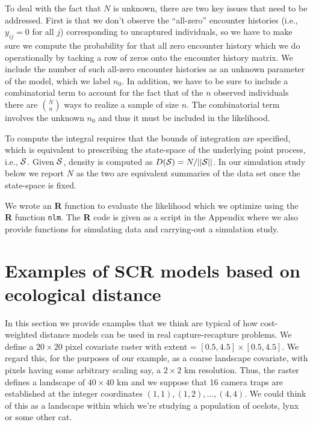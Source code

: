 \documentclass[12pt]{article}
\begin{document}
\begin{spacing}{1.8}
To deal with the fact that $N$ is unknown, there are two key issues
that need to be addressed.  First is that we don't observe the
``all-zero'' encounter histories (i.e., $y_{ij} = 0$ for all $j$)
corresponding to uncaptured individuals, so we have to make sure we
compute the probability for that all zero encounter history which we
do operationally by tacking a row of zeros onto the encounter history
matrix. We include the number of such all-zero encounter histories as
an unknown parameter of the model, which we label $n_{0}$.  In
addition, we have to be sure to include a combinatorial term to
account for the fact that of the $n$ observed individuals there are
${N \choose n}$ ways to realize a sample of size $n$. The
combinatorial term involves the unknown $n_{0}$ and thus it must be
included in the likelihood.

To compute the integral requires that the bounds of integration are
specified, which is equivalent to prescribing the state-space of the
underlying point process, i.e., ${\cal S}$. Given ${\cal S}$, density
is
computed as $D({\cal S}) = N/||{\cal S}||$. In our simulation study
below we report $N$ as the two are equivalent summaries of the data
set once the state-space is fixed.

We wrote an {\bf R} function to evaluate the likelihood which we optimize
using the {\bf R} function \mbox{\tt nlm}.
The {\bf R} code is given as a script in the Appendix where we also
provide functions for simulating data and carrying-out a simulation study.



\section{Examples of SCR models based on ecological distance}

In this section we provide examples that we think are typical of how
cost-weighted distance models can be used in real capture-recapture
problems.  We define a $20 \times 20$ pixel covariate raster with
extent = $[0.5, 4.5] \times [0.5, 4.5]$.  We regard this, for the
purposes of our example, as a coarse landscape covariate, with pixels
having some arbitrary scaling say, a $2 \times 2$ km resolution. Thus,
the raster defines a landscape of $40 \times 40$ km and we suppose
that 16 camera traps are established at the integer coordinates
$(1,1), (1,2), \ldots, (4,4)$. We could think of this as a landscape
within which we're studying a population of ocelots, lynx or some
other cat.


\end{spacing}
\end{document}
